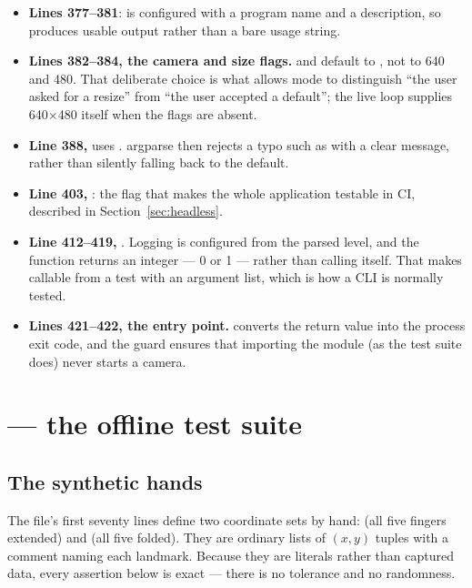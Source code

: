 \begin{itemize}
  \item \textbf{Lines 377--381}:  is configured with a program name and a description,
        so  produces usable output rather than a bare usage string.
  \item \textbf{Lines 382--384, the camera and size flags.}  and 
        default to , not to 640 and 480. That deliberate choice is what allows
         mode to distinguish ``the user asked for a resize'' from ``the user accepted a
        default''; the live loop supplies 640$\times$480 itself when the flags are absent.
  \item \textbf{Line 388, } uses . argparse then
        rejects a typo such as  with a clear message, rather than
        silently falling back to the default.
  \item \textbf{Line 403, }: the flag that makes the whole application testable in CI,
        described in Section~\ref{sec:headless}.
  \item \textbf{Line 412--419, }. Logging is configured from the parsed level, and the
        function returns an integer --- 0 or 1 --- rather than calling  itself. That
        makes  callable from a test with an argument list, which is how a CLI is
        normally tested.
  \item \textbf{Lines 421--422, the entry point.}  converts the return
        value into the process exit code, and the  guard ensures that importing
        the module (as the test suite does) never starts a camera.
\end{itemize}

\section{ --- the offline test suite}
\label{sec:src-tests}

\subsection{The synthetic hands}

The file's first seventy lines define two coordinate sets by hand:  (all five
fingers extended) and  (all five folded). They are ordinary lists of $(x, y)$ tuples with
a comment naming each landmark. Because they are literals rather than captured data, every assertion
below is exact --- there is no tolerance and no randomness.

